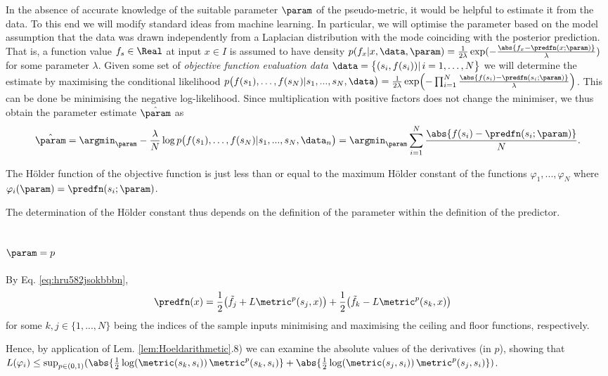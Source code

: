 In the absence of accurate knowledge of the suitable parameter $\param$ of the pseudo-metric, it would be helpful to estimate it from the data. To this end we will modify standard ideas from 
machine learning. In particular, we will optimise the parameter based on the model assumption that the data was drawn independently from a Laplacian distribution with the mode coinciding with the posterior prediction. That is, a function value $f_s \in \Real$ at input $x \in I$ is assumed to have density $p(f_x| x,\data,\param) = \frac{1}{2\lambda}\exp(-\frac{\abs{f_x - \predfn(x;\param)}}{\lambda})$ for some parameter $\lambda$.
Given some set of \emph{objective function evaluation data} $\data = \bigl\{ ( s_i, f(s_i) ) | \, i=1,\dots, N \bigr\}$ we will determine the estimate by maximising the conditional likelihood  
$p\bigl(f(s_1),\ldots,f(s_N)  | s_1,...,s_N,\data \bigr) = \frac{1}{2\lambda}\exp \Bigl(-\prod_{i=1}^N\frac{\abs{f(s_i) - \predfn(s_i;\param)}}{\lambda} \Bigr) $.
This can be done be minimising the negative log-likelihood. Since multiplication with positive factors does not change the minimiser, we thus obtain the parameter estimate $\hat \param$ as  
\begin{equation}
\hat \param = \argmin_\param -\frac{\lambda}{N}\log p\bigl(f(s_1),\ldots,f(s_N)  | s_1,...,s_N,\data_n \bigr) = \argmin_\param \sum_{i=1}^N\frac{\abs{f(s_i) - \predfn(s_i;\param)}}{N}.
\end{equation}

The H\"older function of the objective function is just less than or equal to the maximum H\"older constant of the functions $\varphi_1,...,\varphi_N$ where 
 $\varphi_i (\param) = \predfn(s_i;\param)$.
 
 The determination of the H\"older constant thus depends on the definition of the parameter within the definition of the predictor. 
 
\subsection{$\param = p$}
By Eq. \ref{eq:hru582jsokbbbn},
\begin{align}
\predfn(x) &= \frac 1 2 \bigl( \tilde f_j + L \metric^p(s_j,x)   \bigr) + \frac 1 2 \bigl( \tilde  f_k - L \metric^p(s_k,x) \bigr)
\end{align}
for some $k,j \in \{1,...,N\}$ being the indices of the sample inputs minimising and maximising the ceiling and floor functions, respectively.

 Hence, by application of Lem. \ref{lem:Hoeldarithmetic}.8) we can examine the absolute values of the derivatives (in $p$), showing that  $L(\varphi_i) \leq\sup_{p \in (0,1)} (\abs{ \frac 1 2  \log(\metric(s_k,s_i) ) \, \metric^p(s_k,s_i)  }+ \abs{\frac 1 2 \log(\metric(s_j,s_i) ) \,  \metric^p(s_j,s_i)})$. 
 
